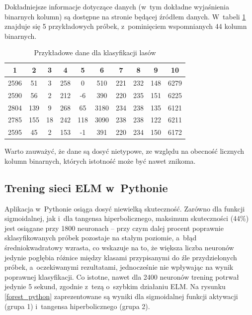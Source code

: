 \documentclass[pl]{minipw} %
\begin{document}
Dokładniejsze informacje dotyczące danych (w~tym dokładne wyjaśnienia binarnych kolumn) są dostępne na stronie będącej źródłem danych. W~tabeli \ref{forest_first_5} znajduje się 5 przykładowych próbek, z~pominięciem wspomnianych 44 kolumn binarnych.
\begin{table}[H]
\caption{Przykładowe dane dla klasyfikacji lasów}
\label{forest_first_5}
\centering
\begin{tabular}{|c|c|c|c|c|c|c|c|c|c|}
\hline
\textbf{1} & \textbf{2} & \textbf{3} & \textbf{4} & \textbf{5} & \textbf{6} & \textbf{7} & \textbf{8} & \textbf{9} & \textbf{10} \\
\hline
2596 & 51 & 3 & 258 & 0 & 510 & 221 & 232 & 148 & 6279 \\
2590 & 56 & 2 & 212 & -6 & 390 & 220 & 235 & 151 & 6225 \\
2804 & 139 & 9 & 268 & 65 & 3180 & 234 & 238 & 135 & 6121 \\
2785 & 155 & 18 & 242 & 118 & 3090 & 238 & 238 & 122 & 6211 \\
2595 & 45 & 2 & 153 & -1 & 391 & 220 & 234 & 150 & 6172 \\
\hline
\end{tabular}
\end{table}

Warto zauważyć, że dane są dosyć nietypowe, ze względu na obecność licznych kolumn binarnych, których istotność może być nawet znikoma.
\subsection{Trening sieci ELM w~Pythonie}
Aplikacja w~Pythonie osiąga dosyć niewielką skuteczność. Zarówno dla funkcji sigmoidalnej, jak i~dla tangensa hiperbolicznego, maksimum skuteczności (44\%) jest osiągane przy 1800 neuronach -- przy czym dalej procent poprawnie sklasyfikowanych próbek pozostaje na stałym poziomie, a~błąd średniokwadratowy wzrasta, co wskazuje na to, że większa liczba neuronów jedynie pogłębia różnice między klasami przypisanymi do źle przydzielonych próbek, a~oczekiwanymi rezultatami, jednocześnie nie wpływając na wynik poprawnej klasyfikacji. Co istotne, nawet dla 2400 neuronów trening potrwał jedynie 5 sekund, zgodnie z~tezą o~szybkim działaniu ELM. 
Na rysunku \ref{forest_python} zaprezentowane są wyniki dla sigmoidalnej funkcji aktywacji (grupa 1) i~tangensa hiperbolicznego (grupa 2). 
\end{document}

